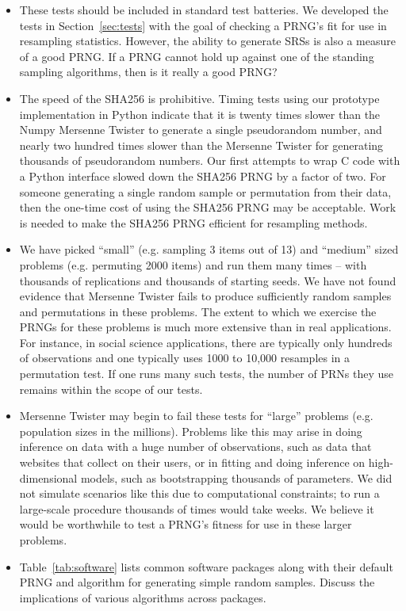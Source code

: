 \documentclass[12pt]{article}
\begin{document}
\begin{itemize}
\item These tests should be included in standard test batteries.
We developed the tests in Section~\ref{sec:tests} with the goal of checking a PRNG's fit for use in resampling statistics.
However, the ability to generate SRSs is also a measure of a good PRNG.
If a PRNG cannot hold up against one of the standing sampling algorithms, then is it really a good PRNG?

\item The speed of the SHA256 is prohibitive. 
Timing tests using our prototype implementation in Python indicate that it is twenty times slower than the Numpy Mersenne Twister to generate a single pseudorandom number, and nearly two hundred times slower than the Mersenne Twister for generating thousands of pseudorandom numbers.
Our first attempts to wrap C code with a Python interface slowed down the SHA256 PRNG by a factor of two.
For someone generating a single random sample or permutation from their data, then the one-time cost of using the SHA256 PRNG may be acceptable.
Work is needed to make the SHA256 PRNG efficient for resampling methods.

\item We have picked ``small'' (e.g. sampling 3 items out of 13) and ``medium'' sized problems (e.g. permuting 2000 items) and run them many times -- with thousands of replications and thousands of starting seeds.
We have not found evidence that Mersenne Twister fails to produce sufficiently random samples and permutations in these problems.
The extent to which we exercise the PRNGs for these problems is much more extensive than in real applications.
For instance, in social science applications, there are typically only hundreds of observations and one typically uses 1000 to 10,000 resamples in a permutation test.
If one runs many such tests, the number of PRNs they use remains within the scope of our tests.

\item Mersenne Twister may begin to fail these tests for ``large'' problems (e.g. population sizes in the millions).
Problems like this may arise in doing inference on data with a huge number of observations, 
such as data that websites that collect on their users,
or in fitting and doing inference on high-dimensional models, 
such as bootstrapping thousands of parameters.
We did not simulate scenarios like this due to computational constraints;
to run a large-scale procedure thousands of times would take weeks.
We believe it would be worthwhile to test a PRNG's fitness for use in these larger problems.

\item Table~\ref{tab:software} lists common software packages along with their default PRNG and algorithm for generating simple random samples. Discuss the implications of various algorithms across packages.
\end{itemize}
\end{document}
